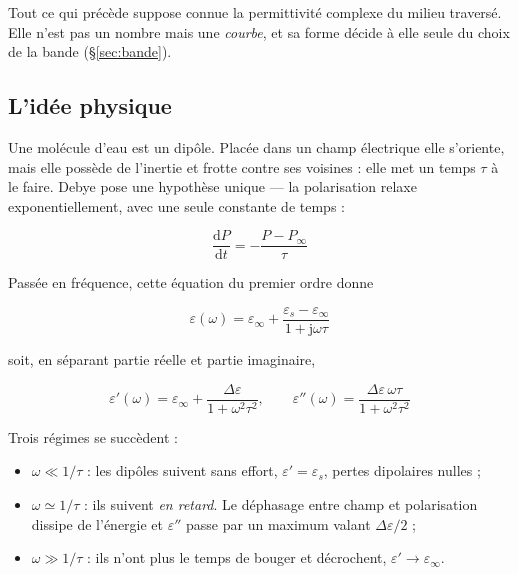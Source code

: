 \documentclass[11pt,a4paper]{article}
\newcommand{\jj}{\mathrm{j}}
\begin{document}
Tout ce qui précède suppose connue la permittivité complexe du milieu traversé.
Elle n'est pas un nombre mais une \emph{courbe}, et sa forme décide à elle seule
du choix de la bande (\S\ref{sec:bande}).

\subsection{L'idée physique}

Une molécule d'eau est un dipôle. Placée dans un champ électrique elle
s'oriente, mais elle possède de l'inertie et frotte contre ses voisines : elle
met un temps $\tau$ à le faire. Debye pose une hypothèse unique --- la
polarisation relaxe exponentiellement, avec une seule constante de temps :

\begin{equation}
\frac{\mathrm{d}P}{\mathrm{d}t} = -\frac{P - P_\infty}{\tau}
\end{equation}

Passée en fréquence, cette équation du premier ordre donne

\begin{equation}
\varepsilon(\omega) = \varepsilon_\infty
   + \frac{\varepsilon_s - \varepsilon_\infty}{1 + \jj\omega\tau}
\label{eq:debye}
\end{equation}

soit, en séparant partie réelle et partie imaginaire,

\begin{equation}
\varepsilon'(\omega) = \varepsilon_\infty
   + \frac{\Delta\varepsilon}{1+\omega^2\tau^2},
\qquad
\varepsilon''(\omega) = \frac{\Delta\varepsilon\,\omega\tau}{1+\omega^2\tau^2}
\end{equation}

Trois régimes se succèdent :

\begin{itemize}
\item $\omega \ll 1/\tau$ : les dipôles suivent sans effort,
      $\varepsilon' = \varepsilon_s$, pertes dipolaires nulles ;
\item $\omega \simeq 1/\tau$ : ils suivent \emph{en retard}. Le déphasage entre
      champ et polarisation dissipe de l'énergie et $\varepsilon''$ passe par un
      maximum valant $\Delta\varepsilon/2$ ;
\item $\omega \gg 1/\tau$ : ils n'ont plus le temps de bouger et décrochent,
      $\varepsilon' \to \varepsilon_\infty$.
\end{itemize}
\end{document}
